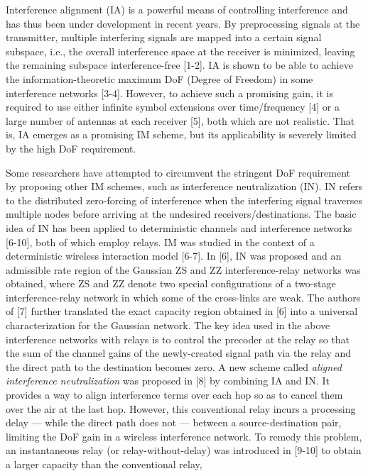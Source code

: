 \documentclass[10pt, conference, letterpaper]{IEEEtran}
\begin{document}
Interference alignment (IA) is a powerful means of controlling interference
and has thus been under development in recent years.
By preprocessing signals at the transmitter, multiple interfering signals are mapped into
a certain signal subspace, i.e., the overall interference space at the receiver is minimized,
leaving the remaining subspace interference-free [1-2].
IA is shown to be able to achieve the information-theoretic maximum DoF
(Degree of Freedom) in some interference networks [3-4].
However, to achieve such a promising gain,
it is required to use either infinite symbol extensions over time/frequency [4]
or a large number of antennas at each receiver [5], both which are not realistic.
That is, IA emerges as a promising IM scheme, but its applicability is severely limited
by the high DoF requirement.

Some researchers have attempted to circumvent the stringent DoF requirement
by proposing other IM schemes, such as interference neutralization (IN).
IN refers to the distributed zero-forcing of interference
when the interfering signal traverses multiple nodes
before arriving at the undesired receivers/destinations.
The basic idea of IN has been applied to deterministic channels %
and interference networks [6-10], both of which employ relays.
IM was studied in the context of a deterministic wireless interaction model [6-7].
In [6], IN was proposed and an admissible rate region of
the Gaussian ZS and ZZ interference-relay networks was obtained, where
ZS and ZZ denote two special configurations of a two-stage interference-relay
network in which some of the cross-links are weak.
The authors of [7] further translated the exact capacity region obtained in [6]
into a universal characterization for the Gaussian network.
The key idea used in the above interference networks with relays is
to control the precoder at the relay so that the sum of the channel gains
of the newly-created signal path via the relay and
the direct path to the destination becomes zero.
A new scheme called {\em aligned interference neutralization} was proposed in [8]
by combining IA and IN. It provides a way to align interference terms
over each hop so as to cancel them over the air at the last hop.
However, this conventional relay incurs a processing delay --- while the direct path
does not --- between a source-destination pair, limiting the DoF gain in a wireless
interference network. To remedy this problem, an instantaneous relay (or relay-without-delay)
was introduced in [9-10] to obtain a larger capacity than the conventional relay,
\end{document}
